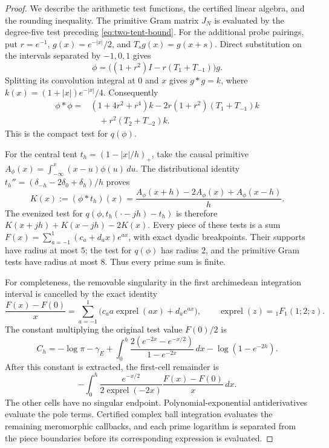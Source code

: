 \begin{proof}
We describe the arithmetic test functions, the certified linear
algebra, and the rounding inequality.  The primitive Gram matrix
$J_N$ is evaluated by the degree-five test preceding
\eqref{eq:two-tent-bound}.  For the additional probe pairings, put
$r=e^{-1}$, $g(x)=e^{-|x|}/2$, and $T_sg(x)=g(x+s)$.  Direct
substitution on the intervals separated by $-1,0,1$ gives
\[
 \phi=\bigl((1+r^2)I-r(T_1+T_{-1})\bigr)g.
\]
Splitting its convolution integral at $0$ and $x$ gives
$g*g=k$, where $k(x)=(1+|x|)e^{-|x|}/4$.  Consequently
\begin{align*}
 \phi*\phi={}&(1+4r^2+r^4)k
   -2r(1+r^2)(T_1+T_{-1})k\\
   &\quad+r^2(T_2+T_{-2})k.
\end{align*}
This is the compact test for $q(\phi)$.

For the central tent $t_h=(1-|x|/h)_+$, take the causal primitive
$A_\phi(x)=\int_{-\infty}^x(x-u)\phi(u)\,du$.  The distributional
identity $t_h''=(\delta_{-h}-2\delta_0+\delta_h)/h$ proves
\[
 K(x):=(\phi*t_h)(x)
   =\frac{A_\phi(x+h)-2A_\phi(x)+A_\phi(x-h)}h.
\]
The evenized test for $q(\phi,t_h(\cdot-jh)-t_h)$ is therefore
$K(x+jh)+K(x-jh)-2K(x)$.  Every piece of these tests is a sum
$F(x)=\sum_{a=-1}^1(c_a+d_ax)e^{ax}$, with exact dyadic
breakpoints.  Their supports have radius at most $5$; the test for
$q(\phi)$ has radius $2$, and the primitive Gram tests have radius
at most $8$.  Thus every prime sum is finite.

For completeness, the removable singularity in the first
archimedean integration interval is cancelled by the exact identity
\[
 \frac{F(x)-F(0)}x
   =\sum_{a=-1}^1
        \bigl(c_a a\operatorname{exprel}(ax)+d_a e^{ax}\bigr),
 \qquad
 \operatorname{exprel}(z)={}_1F_1(1;2;z).
\]
The constant multiplying the original test value $F(0)/2$ is
\[
 C_h=-\log\pi-\gamma_E
   +\int_0^h\frac{2(e^{-2x}-e^{-x/2})}{1-e^{-2x}}\,dx
   -\log(1-e^{-2h}).
\]
After this constant is extracted, the first-cell remainder is
\[
 -\int_0^h
    \frac{e^{-x/2}}{2\operatorname{exprel}(-2x)}
                      \frac{F(x)-F(0)}x\,dx.
\]
The other cells have no singular endpoint.  Polynomial-exponential
antiderivatives evaluate the pole terms.  Certified complex ball
integration evaluates the remaining meromorphic callbacks, and
each prime logarithm is separated from the piece boundaries before
its corresponding expression is evaluated.


\end{proof}
